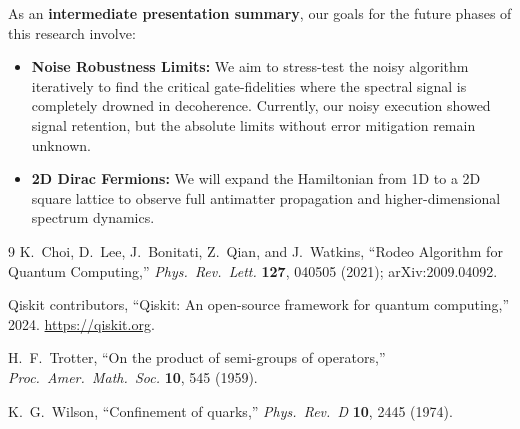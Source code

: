 \documentclass[twocolumn,10pt]{article}
\begin{document}
As an \textbf{intermediate presentation summary}, our goals for the future 
phases of this research involve:
\begin{itemize}
\item \textbf{Noise Robustness Limits:} We aim to stress-test the noisy 
  algorithm iteratively to find the critical gate-fidelities where 
  the spectral signal is completely drowned in decoherence. Currently, 
  our noisy execution showed signal retention, but the absolute limits 
  without error mitigation remain unknown.
\item \textbf{2D Dirac Fermions:} We will expand the Hamiltonian from 1D to 
  a 2D square lattice to observe full antimatter propagation and 
  higher-dimensional spectrum dynamics.
\end{itemize}

\begin{thebibliography}{9}
K.~Choi, D.~Lee, J.~Bonitati, Z.~Qian, and J.~Watkins,
``Rodeo Algorithm for Quantum Computing,''
\textit{Phys.\ Rev.\ Lett.} \textbf{127}, 040505 (2021);
arXiv:2009.04092.

Qiskit contributors,
``Qiskit: An open-source framework for quantum computing,''
2024. \url{https://qiskit.org}.

H.~F.~Trotter,
``On the product of semi-groups of operators,''
\textit{Proc.\ Amer.\ Math.\ Soc.} \textbf{10}, 545 (1959).

K.~G.~Wilson,
``Confinement of quarks,''
\textit{Phys.\ Rev.\ D} \textbf{10}, 2445 (1974).
\end{thebibliography}
\end{document}
